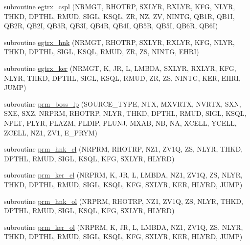 \begin{DoxyCompactItemize}
\item 
subroutine \hyperlink{Leroi__c_8f90_a10fd9ada0ec15151a8112666c09a245d}{egtrx\+\_\+cspl} (N\+R\+M\+GT, R\+H\+O\+T\+RP, S\+X\+L\+YR, R\+X\+L\+YR, K\+FG, N\+L\+YR, T\+H\+KD, D\+P\+T\+HL, R\+M\+UD, S\+I\+GL, K\+S\+QL, ZR, NZ, ZV, N\+I\+N\+TG, Q\+B1R, Q\+B1I, Q\+B2R, Q\+B2I, Q\+B3R, Q\+B3I, Q\+B4R, Q\+B4I, Q\+B5R, Q\+B5I, Q\+B6R, Q\+B6I)
\item 
subroutine \hyperlink{Leroi__c_8f90_a5489646b1d19d3a2a814c56265bd78fb}{egtrx\+\_\+hnk} (N\+R\+M\+GT, R\+H\+O\+T\+RP, S\+X\+L\+YR, R\+X\+L\+YR, K\+FG, N\+L\+YR, T\+H\+KD, D\+P\+T\+HL, S\+I\+GL, K\+S\+QL, R\+M\+UD, ZR, ZS, N\+I\+N\+TG, E\+H\+RI)
\item 
subroutine \hyperlink{Leroi__c_8f90_aed79c3eb3332f2cd1b4c25c6c825e360}{egtrx\+\_\+ker} (N\+R\+M\+GT, K, JR, L, L\+M\+B\+DA, S\+X\+L\+YR, R\+X\+L\+YR, K\+FG, N\+L\+YR, T\+H\+KD, D\+P\+T\+HL, S\+I\+GL, K\+S\+QL, R\+M\+UD, ZR, ZS, N\+I\+N\+TG, K\+ER, E\+H\+RI, J\+U\+MP)
\item 
subroutine \hyperlink{Leroi__c_8f90_ae4548433d1a40c9ae5dce4d7404c9404}{prm\+\_\+boss\+\_\+lp} (S\+O\+U\+R\+C\+E\+\_\+\+T\+Y\+PE, N\+TX, M\+X\+V\+R\+TX, N\+V\+R\+TX, S\+XN, S\+XE, S\+XZ, N\+R\+P\+RM, R\+H\+O\+T\+RP, N\+L\+YR, T\+H\+KD, D\+P\+T\+HL, R\+M\+UD, S\+I\+GL, K\+S\+QL, N\+P\+LT, P\+L\+YR, P\+L\+A\+ZM, P\+L\+D\+IP, P\+L\+U\+NJ, M\+X\+AB, NB, NA, X\+C\+E\+LL, Y\+C\+E\+LL, Z\+C\+E\+LL, N\+Z1, Z\+V1, E\+\_\+\+P\+R\+YM)
\item 
subroutine \hyperlink{Leroi__c_8f90_a677c57fa23bac760da7b8f845b3f9f9d}{prm\+\_\+hnk\+\_\+cl} (N\+R\+P\+RM, R\+H\+O\+T\+RP, N\+Z1, Z\+V1Q, ZS, N\+L\+YR, T\+H\+KD, D\+P\+T\+HL, R\+M\+UD, S\+I\+GL, K\+S\+QL, K\+FG, S\+X\+L\+YR, H\+L\+Y\+RD)
\item 
subroutine \hyperlink{Leroi__c_8f90_a04185f4ba85efc3e493f2de9019a69da}{prm\+\_\+ker\+\_\+cl} (N\+R\+P\+RM, K, JR, L, L\+M\+B\+DA, N\+Z1, Z\+V1Q, ZS, N\+L\+YR, T\+H\+KD, D\+P\+T\+HL, R\+M\+UD, S\+I\+GL, K\+S\+QL, K\+FG, S\+X\+L\+YR, K\+ER, H\+L\+Y\+RD, J\+U\+MP)
\item 
subroutine \hyperlink{Leroi__c_8f90_a89b4321e05fd2190aba745c6eec86645}{prm\+\_\+hnk\+\_\+ol} (N\+R\+P\+RM, R\+H\+O\+T\+RP, N\+Z1, Z\+V1Q, ZS, N\+L\+YR, T\+H\+KD, D\+P\+T\+HL, R\+M\+UD, S\+I\+GL, K\+S\+QL, K\+FG, S\+X\+L\+YR, H\+L\+Y\+RD)
\item 
subroutine \hyperlink{Leroi__c_8f90_a5a775b5fbe7ca4b27ec968d5efde2795}{prm\+\_\+ker\+\_\+ol} (N\+R\+P\+RM, K, JR, L, L\+M\+B\+DA, N\+Z1, Z\+V1Q, ZS, N\+L\+YR, T\+H\+KD, D\+P\+T\+HL, R\+M\+UD, S\+I\+GL, K\+S\+QL, K\+FG, S\+X\+L\+YR, K\+ER, H\+L\+Y\+RD, J\+U\+MP)

\end{DoxyCompactItemize}
